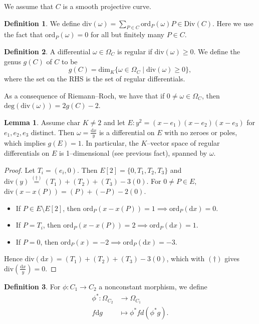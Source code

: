 \documentclass{article}
\theoremstyle{definition}
\newtheorem{lemma}[theorem]{Lemma}
\newtheorem{defn}{Definition}[section]
\begin{document}
We assume that $C$ is a smooth projective curve.
\begin{defn}
    We define $\text{div}(\omega) = \sum_{P \in C}^{} \text{ord}_P(\omega)P \in \text{Div}(C)$. Here we use the fact that $\text{ord}_P(\omega) = 0$ for all but finitely many $P \in C$.
\end{defn}
\begin{defn}
    A differential $\omega \in \Omega_C$ is regular if $\text{div}(\omega)\ge 0$. We define the genus $g(C)$ of $C$ to be \[
    g(C) = \text{dim}_K \{\omega \in \Omega_C \mid \text{div}(\omega)\ge 0\},
    \]
    where the set on the RHS is the set of regular differentials.
\end{defn}
As a consequence of Riemann--Roch, we have that if $0 \neq \omega \in \Omega_C$, then $\text{deg}(\text{div}(\omega)) = 2g(C)-2$.
\begin{lemma}
    Assume $\text{char }K \neq 2$ and let $E : y^2 = (x-e_1)(x-e_2)(x-e_3)$ for $e_1,e_2,e_3$ distinct. Then $\omega = \frac{\mathrm{d}x}{y}$ is a differential on $E$ with no zeroes or poles, which implies $g(E)=1$. In particular, the $K$--vector space of regular differentials on $E$ is 1--dimensional (see previous fact), spanned by $\omega$.
\end{lemma}
\begin{proof}
    Let $T_i = (e_i,0)$. Then $E[2]=\{0,T_1,T_2,T_3\}$ and $\text{div}(y) \stackrel{(\dagger)}{=} (T_1)+(T_2)+(T_3)-3(0)$. For $0 \neq P \in E$, $\text{div}(x-x(P)) = (P)+(-P)-2(0)$. 
    \begin{itemize}
        \item If $P \in E\setminus E[2]$, then $\text{ord}_P(x-x(P))=1 \implies \text{ord}_P(\mathrm{d}x) = 0$.
        \item If $P = T_i$, then $\text{ord}_P(x-x(P)) = 2 \implies \text{ord}_P(\mathrm{d}x)=1$. 
        \item If $P=0$, then $\text{ord}_P(x)= - 2 \implies \text{ord}_P(\mathrm{d}x) = -3$.
    \end{itemize}
    Hence $\text{div}(\mathrm{d}x) = (T_1)+(T_2)+(T_3) - 3(0)$, which with $(\dagger)$ gives $\text{div}\left(\frac{\mathrm{d}x}{y}\right) = 0$.
\end{proof}
\begin{defn}
    For $\phi : C_1 \to C_2$ a nonconstant morphism, we define 
    \begin{align*}
        \phi^* : \Omega_{C_2} &\to \Omega_{C_1}\\
        f \mathrm{d}g &\mapsto \phi^* f d(\phi^* g).
    \end{align*}
\end{defn}
\end{document}
